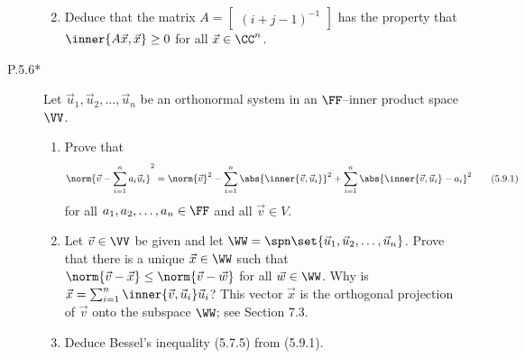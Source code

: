 \documentclass{homework}
\begin{document}
\begin{description}
\begin{enumerate}
    \begin{solution}

    \end{solution}

  \item Deduce that the matrix
    \(A = \begin{bmatrix} (i+j-1)^{-1} \end{bmatrix}\) has the
    property that \(\inner{A \vec x, \vec x} \ge 0\) for all
    \(\vec x \in \CC^n\).

    \begin{solution}

    \end{solution}
  \end{enumerate}


\item[P.5.6*]
  Let \(\vec u_1, \vec u_2, \dots, \vec u_n\) be an orthonormal system
  in an \(\FF\)--inner product space \(\VV\).
  \begin{enumerate}
  \item Prove that
    \[
      \norm{\vec v - \sum_{i=1}^n a_i \vec u_i}^2 =
      \norm{\vec v}^2 -
      \sum_{i=1}^n \abs{\inner{\vec v, \vec u_i}}^2 +
      \sum_{i=1}^n \abs{\inner{\vec v, \vec u_i} - a_i}^2
      \tag{5.9.1}
    \]
    for all \(a_1, a_2, \dots, a_n \in \FF\) and all \(\vec v \in V\).

    \begin{solution}

    \end{solution}

  \item Let \(\vec v \in \VV\) be given and let
    \(\WW = \spn\set{\vec u_1, \vec u_2, \dots, \vec u_n}\).  Prove
    that there is a unique \(\vec x \in \WW\) such that
    \(\norm{\vec v - \vec x} \le \norm{\vec v - \vec w}\) for all
    \(\vec w \in \WW\).  Why is
    \(\vec x = \sum_{i=1}^n \inner{\vec v, \vec u_i} \vec u_i\)?  This
    vector \(\vec x\) is the orthogonal projection of \(\vec v\) onto
    the subspace \(\WW\); see Section 7.3.

    \begin{solution}

    \end{solution}

  \item Deduce Bessel's inequality (5.7.5) from (5.9.1).

    \begin{solution}


\end{solution}
\end{enumerate}
\end{description}
\end{document}
